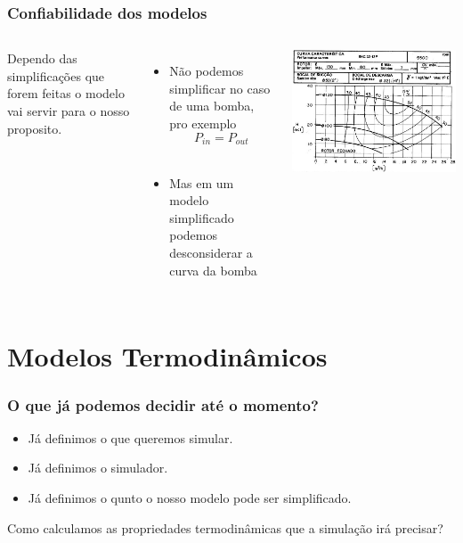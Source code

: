 \documentclass[aspectratio=169]{beamer}
\begin{document}
\begin{frame}
	\frametitle{Confiabilidade dos modelos}
	\begin{columns}[c] 
		Dependo das simplificações que forem feitas o modelo vai servir para o
		nosso proposito.\\
		\begin{itemize}
			\item Não podemos simplificar no caso de uma bomba, pro exemplo \\
 				\begin{equation*}
				P_{in}=P_{out}
 				\end{equation*}\\
			\pause
			\item Mas em um modelo simplificado podemos desconsiderar a curva da
			bomba
		\end{itemize}
		\begin{center}
			\includegraphics[width=\textwidth]{img/curva_bomba2.jpg}
		\end{center}
	\end{columns}
\end{frame}

\section{Modelos Termodinâmicos}

\begin{frame}
	\frametitle{O que já podemos decidir até o momento?}
	\begin{itemize}
		\item Já definimos o que queremos simular.
		\item Já definimos o simulador.
		\item Já definimos o qunto o nosso modelo pode ser simplificado.
	\end{itemize}
	\pause
	Como calculamos as propriedades termodinâmicas que a simulação irá precisar?
\end{frame}
\end{document}
